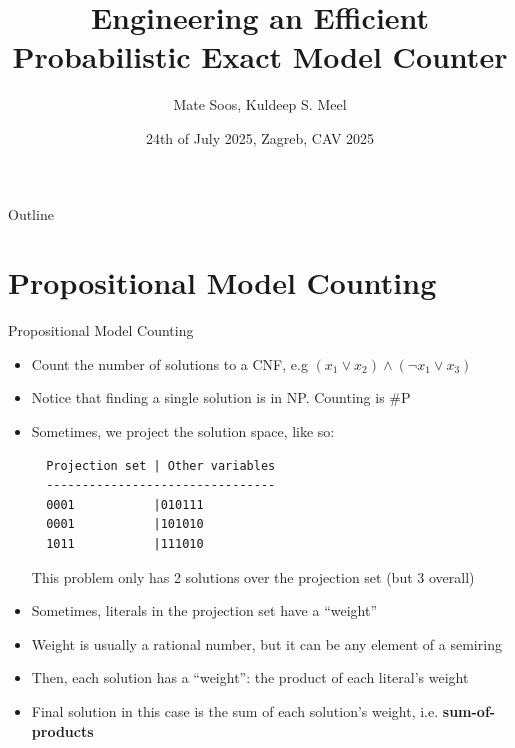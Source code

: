 \documentclass[aspectratio=169]{beamer}
\title[Engineering an Efficient Model Counter]{Engineering an Efficient Probabilistic Exact Model Counter}
\author[Soos, Meel]{Mate Soos, Kuldeep S. Meel}
\institute[UofT, GATech]{\large University of Toronto, Georgia Tech}
\date{24th of July 2025, Zagreb, CAV 2025}
\begin{document}
\begin{frame} \titlepage
\end{frame}

\begin{frame}{Outline}
    \tableofcontents
\end{frame}

\section{Propositional Model Counting}
\begin{frame}[fragile=singleslide]{Propositional Model Counting}
\begin{itemize}
  \item Count the number of solutions to a CNF, e.g $(x_1 \lor x_2) \land (\neg x_1 \lor x_3)$
  \item Notice that finding a single solution is in NP. Counting is \#P
  \item Sometimes, we project the solution space, like so:
  \begin{verbatim}
  Projection set | Other variables
  --------------------------------
  0001           |010111
  0001           |101010
  1011           |111010
  \end{verbatim} This problem only has 2 solutions over the projection set (but
  3 overall)
  \item Sometimes, literals in the projection set have a ``weight''
  \item Weight is usually a rational number, but it can be any element of
    a semiring
  \item Then, each solution has a ``weight'': the product of each literal's weight
  \item Final solution in this case is the sum of each solution's weight, i.e.
    \textbf{sum-of-products}
\end{itemize}
\end{frame}
\end{document}
